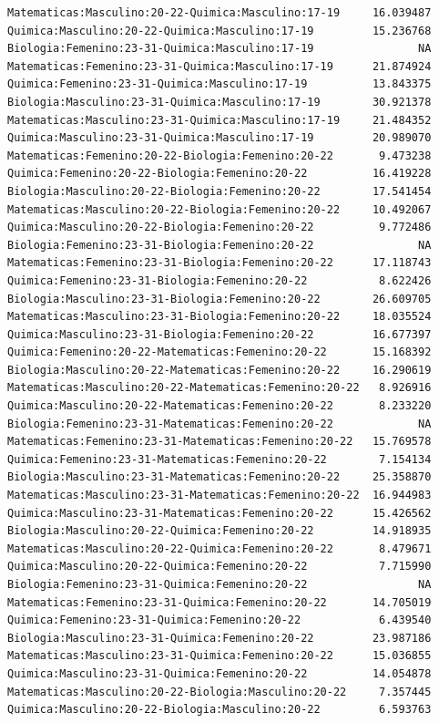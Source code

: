 \documentclass{rapport}
\begin{document}
\begin{itemize}
\begin{verbatim}
Matematicas:Masculino:20-22-Quimica:Masculino:17-19     16.039487
Quimica:Masculino:20-22-Quimica:Masculino:17-19         15.236768
Biologia:Femenino:23-31-Quimica:Masculino:17-19                NA
Matematicas:Femenino:23-31-Quimica:Masculino:17-19      21.874924
Quimica:Femenino:23-31-Quimica:Masculino:17-19          13.843375
Biologia:Masculino:23-31-Quimica:Masculino:17-19        30.921378
Matematicas:Masculino:23-31-Quimica:Masculino:17-19     21.484352
Quimica:Masculino:23-31-Quimica:Masculino:17-19         20.989070
Matematicas:Femenino:20-22-Biologia:Femenino:20-22       9.473238
Quimica:Femenino:20-22-Biologia:Femenino:20-22          16.419228
Biologia:Masculino:20-22-Biologia:Femenino:20-22        17.541454
Matematicas:Masculino:20-22-Biologia:Femenino:20-22     10.492067
Quimica:Masculino:20-22-Biologia:Femenino:20-22          9.772486
Biologia:Femenino:23-31-Biologia:Femenino:20-22                NA
Matematicas:Femenino:23-31-Biologia:Femenino:20-22      17.118743
Quimica:Femenino:23-31-Biologia:Femenino:20-22           8.622426
Biologia:Masculino:23-31-Biologia:Femenino:20-22        26.609705
Matematicas:Masculino:23-31-Biologia:Femenino:20-22     18.035524
Quimica:Masculino:23-31-Biologia:Femenino:20-22         16.677397
Quimica:Femenino:20-22-Matematicas:Femenino:20-22       15.168392
Biologia:Masculino:20-22-Matematicas:Femenino:20-22     16.290619
Matematicas:Masculino:20-22-Matematicas:Femenino:20-22   8.926916
Quimica:Masculino:20-22-Matematicas:Femenino:20-22       8.233220
Biologia:Femenino:23-31-Matematicas:Femenino:20-22             NA
Matematicas:Femenino:23-31-Matematicas:Femenino:20-22   15.769578
Quimica:Femenino:23-31-Matematicas:Femenino:20-22        7.154134
Biologia:Masculino:23-31-Matematicas:Femenino:20-22     25.358870
Matematicas:Masculino:23-31-Matematicas:Femenino:20-22  16.944983
Quimica:Masculino:23-31-Matematicas:Femenino:20-22      15.426562
Biologia:Masculino:20-22-Quimica:Femenino:20-22         14.918935
Matematicas:Masculino:20-22-Quimica:Femenino:20-22       8.479671
Quimica:Masculino:20-22-Quimica:Femenino:20-22           7.715990
Biologia:Femenino:23-31-Quimica:Femenino:20-22                 NA
Matematicas:Femenino:23-31-Quimica:Femenino:20-22       14.705019
Quimica:Femenino:23-31-Quimica:Femenino:20-22            6.439540
Biologia:Masculino:23-31-Quimica:Femenino:20-22         23.987186
Matematicas:Masculino:23-31-Quimica:Femenino:20-22      15.036855
Quimica:Masculino:23-31-Quimica:Femenino:20-22          14.054878
Matematicas:Masculino:20-22-Biologia:Masculino:20-22     7.357445
Quimica:Masculino:20-22-Biologia:Masculino:20-22         6.593763

\end{verbatim}
\end{itemize}
\end{document}
